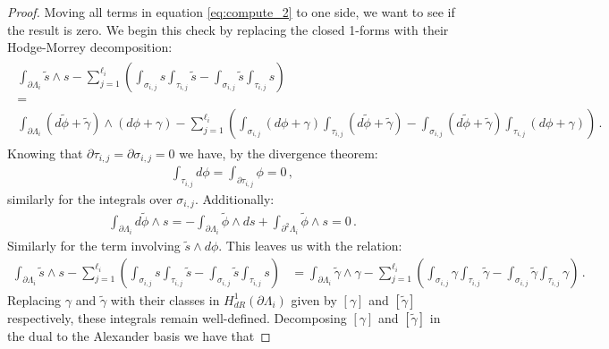 \documentclass[11pt]{article}
\theoremstyle{plain}
\theoremstyle{definition}
\theoremstyle{remark}
\newcommand{\ST}{\Lambda}
\begin{document}
\begin{proof}
Moving all terms in equation \eqref{eq:compute_2} to one side, we want to see if the result is zero. We begin this check by replacing the closed 1-forms with their Hodge-Morrey decomposition:
\begin{align*}
\begin{gathered}
    \int_{\partial \ST_i} \tilde{s} \wedge s - \sum_{j=1}^{\ell_i}  \left( \int_{\sigma_{i,j}} s \int_{\tau_{i,j}} \tilde{s} - \int_{\sigma_{i,j}} \tilde{s}    \int_{\tau_{i,j}} s \right) 
    \\ = \\   \int_{\partial \ST_i} (d \tilde{\phi} + \tilde{\gamma}) \wedge (d \phi + \gamma) -  \sum_{j=1}^{\ell_i}  \left( \int_{\sigma_{i,j}} (d \phi + \gamma) \int_{\tau_{i,j}} (d \tilde{\phi} + \tilde{\gamma}) - \int_{\sigma_{i,j}} (d \tilde{\phi} + \tilde{\gamma})    \int_{\tau_{i,j}} (d \phi + \gamma) \right)  \, . 
\end{gathered}
\end{align*}
Knowing that \(\partial \tau_{i,j} = \partial \sigma_{i,j} = 0\) we have, by the divergence theorem:
\begin{align*}
    \int_{\tau_{i,j}} d \phi  = \int_{\partial \tau_{i,j}} \phi = 0 \, ,
\end{align*}
similarly for the integrals over \(\sigma_{i,j}\). Additionally:
\begin{align*}
    \int_{\partial \ST_i} d \tilde{\phi}  \wedge s
    =
    - \int_{\partial \ST_i}  \tilde{\phi}  \wedge ds
    +
    \int_{\partial^2 \ST_i}  \tilde{\phi}  \wedge s = 0 \, .
\end{align*}
Similarly for the term involving \(\tilde s \wedge d \phi  \). This leaves us with the relation:
\begin{align}\label{eq:compute}
    \int_{\partial \ST_i} \tilde{s} \wedge s - \sum_{j=1}^{\ell_i}  \left( \int_{\sigma_{i,j}} \! s \int_{\tau_{i,j}}  \!  \tilde{s} - \int_{\sigma_{i,j}} \!  \tilde{s}    \int_{\tau_{i,j}} \!  s \right) 
    &=   \int_{\partial \ST_i} \tilde{\gamma} \wedge \gamma -  \sum_{j=1}^{\ell_i}  \left( \int_{\sigma_{i,j}} \!  \gamma \int_{\tau_{i,j}}  \! \tilde{\gamma} - \int_{\sigma_{i,j}}  \! \tilde{\gamma}    \int_{\tau_{i,j}}  \! \gamma \right)  \, .
\end{align}
Replacing \(\gamma\) and \(\tilde{\gamma}\) with their classes in \(H^1_{dR}(\partial \ST_i)\) given by \([\gamma]\) and \([\tilde{\gamma}]\) respectively, these integrals remain well-defined. Decomposing \([\gamma] \) and \([\tilde{\gamma}]\) in the dual to the Alexander basis we have that 

\end{proof}
\end{document}

